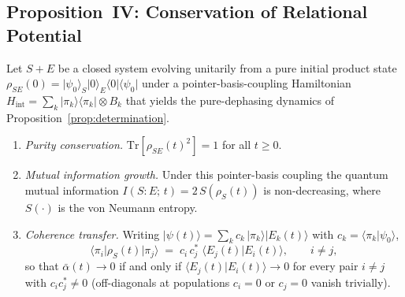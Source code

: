 
\subsection{\label{sec:prop4}Proposition~IV:
            Conservation of Relational Potential}

\begin{proposition}
\label{prop:conservation}
Let $S{+}E$ be a closed system evolving unitarily from a pure initial
product state $\rho_{SE}(0)
  = \vert\psi_0\rangle_S\vert 0\rangle_E\langle 0\vert\langle\psi_0\vert$
under a pointer-basis-coupling Hamiltonian
$H_{\mathrm{int}} = \sum_k\vert\pi_k\rangle\langle\pi_k\vert\otimes B_k$
that yields the pure-dephasing dynamics of
Proposition~\ref{prop:determination}.
\begin{enumerate}
  \item[\emph{(i)}] \emph{Purity conservation.}
    $\mathrm{Tr}[\rho_{SE}(t)^2] = 1$ for all $t \geq 0$.
  \item[\emph{(ii)}] \emph{Mutual information growth.}
    Under this pointer-basis coupling the quantum mutual information
    $I(S\!:\!E;\,t) = 2\,S(\rho_S(t))$
    is non-decreasing, where $S(\cdot)$ is the von Neumann entropy.
  \item[\emph{(iii)}] \emph{Coherence transfer.}
    Writing $\vert\psi(t)\rangle = \sum_k c_k\,
    \vert\pi_k\rangle\vert E_k(t)\rangle$ with
    $c_k = \langle\pi_k\vert\psi_0\rangle$,
    \begin{equation}
    \label{eq:coherence-transfer}
      \langle\pi_i\vert\rho_S(t)\vert\pi_j\rangle
      \;=\; c_i\,c_j^*\;\langle E_j(t)\vert E_i(t)\rangle,
      \qquad i \neq j,
    \end{equation}
    so that $\bar{\alpha}(t) \to 0$ if and only if
    $\langle E_j(t)\vert E_i(t)\rangle \to 0$ for every pair $i \neq j$
    with $c_i c_j^* \neq 0$ (off-diagonals at populations $c_i = 0$
    or $c_j = 0$ vanish trivially).
\end{enumerate}
\end{proposition}

